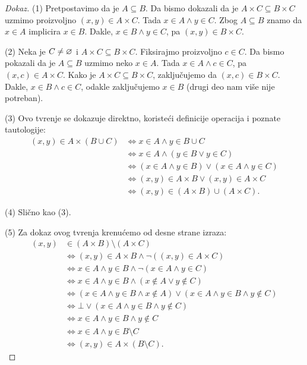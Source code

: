 \begin{proof}[Dokaz]
  (1)
  Pretpostavimo da je $A \subseteq B$. Da bismo dokazali da je $A \times C \subseteq B \times C$ uzmimo
  proizvoljno $(x, y) \in A \times C$. Tada $x \in A \land y \in C$. Zbog $A \subseteq B$ znamo da
  $x \in A$ implicira $x \in B$. Dakle, $x \in B \land y \in C$, pa $(x, y) \in B \times C$.
  
  \medskip
  
  (2) Neka je $C \ne \varnothing$ i $A \times C \subseteq B \times C$. Fiksirajmo proizvoljno $c \in C$.
  Da bismo pokazali da je $A \subseteq B$ uzmimo neko $x \in A$. Tada $x \in A \land c \in C$, pa
  $(x, c) \in A \times C$. Kako je $A \times C \subseteq B \times C$, zaklju\v cujemo da
  $(x, c) \in B \times C$. Dakle, $x \in B \land c \in C$, odakle zaklju\v cujemo $x \in B$ (drugi deo
  nam vi\v se nije potreban).
  
  \medskip
  
  (3)
  Ovo tvr\dj enje se dokazuje direktno, koriste\'ci definicije operacija i poznate tautologije:
  \begin{align*}
    (x, y) \in A \times (B \cup C)
    &\Leftrightarrow x \in A \land y \in B \cup C\\
    &\Leftrightarrow x \in A \land (y \in B \lor y \in C)\\
    &\Leftrightarrow (x \in A \land y \in B) \lor (x \in A \land y \in C)\\
    &\Leftrightarrow (x, y) \in A \times B \lor (x, y) \in A \times C\\
    &\Leftrightarrow (x, y) \in (A \times B) \cup (A \times C).
  \end{align*}
  
  \medskip
  
  (4) Sli\v cno kao (3).
  
  \medskip
  
  (5)
  Za dokaz ovog tvr\dj enja krenu\'cemo od desne strane izraza:
  \begin{align*}
    (x, y) & \in (A \times B) \setminus (A \times C)\\
    &\Leftrightarrow (x, y) \in A \times B \land \lnot((x, y) \in A \times C)\\
    &\Leftrightarrow x \in A \land y \in B \land \lnot(x \in A \land y \in C)\\
    &\Leftrightarrow x \in A \land y \in B \land (x \notin A \lor y \notin C)\\
    &\Leftrightarrow (x \in A \land y \in B \land x \notin A) \lor (x \in A \land y \in B \land y \notin C)\\
    &\Leftrightarrow \bot \lor (x \in A \land y \in B \land y \notin C)\\
    &\Leftrightarrow x \in A \land y \in B \land y \notin C\\
    &\Leftrightarrow x \in A \land y \in B \setminus C\\
    &\Leftrightarrow (x, y) \in A \times (B \setminus C).
  \end{align*}


\end{proof}
